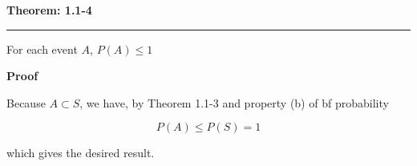 \nopagenumbers
{\bf Theorem: 1.1-4}
\vskip 1mm
\hrule

\vskip 6pt
For each event $A$, $P(A)\leq 1$

\vskip 10pt
{\bf Proof}

\vskip 6pt
Because $A\subset S$, we have, by Theorem 1.1-3 and property (b) of {bf probability}

$$P(A)\leq P(S)=1$$

which gives the desired result.


\vfill\eject
\bye
